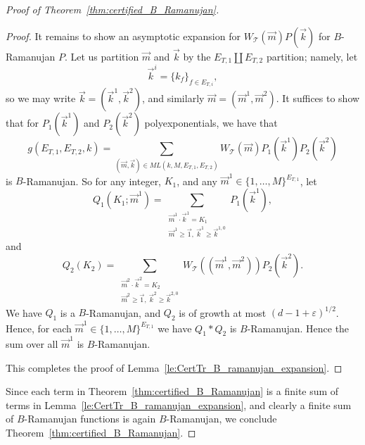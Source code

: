 \documentclass{memo-l}
\theoremstyle{plain}
\theoremstyle{definition}
\numberwithin{section}{chapter}
\numberwithin{equation}{chapter}
\theoremstyle{plain}
\theoremstyle{definition}
\newcommand\cT{\mathcal{T}}
\begin{document}
\begin{proof}[Proof of Theorem~\ref{thm:certified_B_Ramanujan}]
\begin{proof}
It remains to show an asymptotic expansion for $W_\cT(\vec m)P(\vec k)$ for
$B$-Rama\-nujan $P$.  Let us partition $\vec m$ and $\vec k$ by the
$E_{T,1}\amalg E_{T,2}$ partition; namely, let $$ \vec k^i = \{ k_f
\}_{f\in E_{T,i}}, $$ so we may write $\vec k = (\vec k^1,\vec k^2)$, and
similarly $\vec m = (\vec m^1,\vec m^2)$.  It suffices to show that for
$P_1(\vec k^1)$ and $P_2(\vec k^2)$ polyexponentials, we have that $$
g(E_{T,1},E_{T,2},k) = \sum_{(\vec m,\vec k)\in ML(k,M,E_{T,1},E_{T,2}) }
W_\cT(\vec m) P_1(\vec k^1) P_2(\vec k^2) $$ is $B$-Ramanujan.  So for any
integer, $K_1$, and any $\vec m^1\in \{1,\ldots,M\}^{E_{T,1}}$, let $$
Q_1(K_1;\vec m^1) = \sum_{ \substack{ \vec m^1 \cdot \vec k^1 = K_1 \\ \vec
m^1\geq \vec 1,\ \vec k^1\geq \vec k^{1,0} } } P_1(\vec k^1), $$ and $$
Q_2(K_2) = \sum_{ \substack{ \vec m^2 \cdot \vec k^2 = K_2 \\ \vec m^2\geq
\vec 1,\ \vec k^2\geq \vec k^{2,0} } } W_\cT( (\vec m^1,\vec m^2) )
P_2(\vec k^2).  $$ We have $Q_1$ is a $B$-Ramanujan, and $Q_2$ is of growth
at most $(d-1+\varepsilon)^{1/2}$. Hence, for each $\vec m^1\in
\{1,\ldots,M\}^{E_{T,1}}$ we have $Q_1 * Q_2$ is $B$-Ramanujan.  Hence the
sum over all $\vec m^1$ is $B$-Ramanujan.

This completes the proof of Lemma~\ref{le:CertTr_B_ramanujan_expansion}.
\end{proof}
Since each term in Theorem~\ref{thm:certified_B_Ramanujan} is a finite
sum of terms in 
Lemma~\ref{le:CertTr_B_ramanujan_expansion}, and clearly a finite sum
of $B$-Ramanujan functions is again $B$-Ramanujan,
we conclude
Theorem~\ref{thm:certified_B_Ramanujan}.
\end{proof}
%
\end{document}
